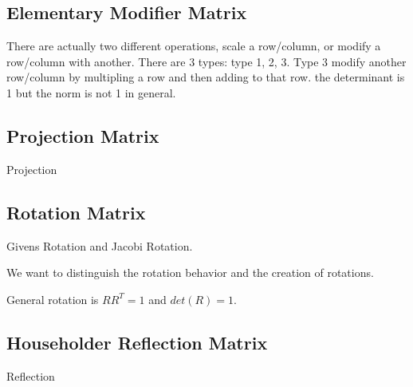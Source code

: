 \subsection{Elementary Modifier Matrix}
There are actually two different operations, scale a row/column, or modify a row/column with another.
There are 3 types: type 1, 2, 3.
Type 3 modify another row/column by multipling a row and then adding to that row. the determinant is 1 but the norm is not 1 in general.

\subsection{Projection Matrix}
Projection

\subsection{Rotation Matrix}
Givens Rotation and Jacobi Rotation.

We want to distinguish the rotation behavior and the creation of rotations.

General rotation is \(RR^T = 1\) and \(det(R) = 1\).

\subsection{Householder Reflection Matrix}
Reflection



